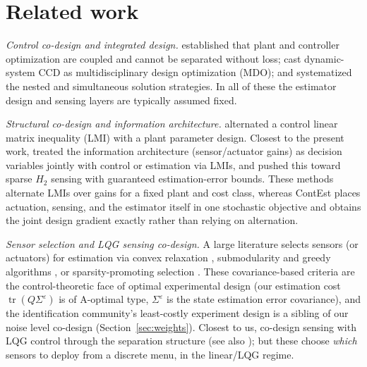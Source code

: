 \documentclass[twocolumn,amsthm]{autart}
\begin{document}
\section{Related work}\label{sec:related}

\emph{Control co-design and integrated design.}
\cite{fathy2001coupling} established that plant and controller optimization are
coupled and cannot be separated without loss; \cite{allison2014multidisciplinary}
cast dynamic-system CCD as multidisciplinary design optimization (MDO); and
\cite{herber2019nested} systematized the nested and simultaneous solution
strategies. In all of these the estimator design and sensing layers are typically assumed fixed.

\emph{Structural co-design and information architecture.}
\cite{grigoriadis1998integrate} alternated a control linear matrix inequality (LMI) with a plant parameter design. Closest to the present work, \cite{li2008integrating} treated the information architecture (sensor/actuator gains) as decision variables jointly with control or estimation via LMIs, and \cite{saraf2017h2,das2017sparse} pushed this toward sparse $H_2$ sensing with guaranteed estimation-error bounds. These methods alternate LMIs over gains for a fixed plant and cost class, whereas ContEst places actuation, sensing, and the estimator itself in one stochastic objective and obtains the joint design gradient exactly rather than relying on alternation.

\emph{Sensor selection and LQG sensing co-design.}
A large literature selects sensors (or actuators) for estimation via
convex relaxation \cite{joshi2009sensor}, submodularity and greedy algorithms
\cite{tzoumas2016sensor,zhang2017sensor}, or sparsity-promoting selection
\cite{dhingra2014admm}. These covariance-based criteria are the control-theoretic
face of optimal experimental design (our estimation cost
$\operatorname{tr}(Q\Sigma^\varepsilon)$ is of A-optimal type, $\Sigma^\varepsilon$ is the state estimation error covariance), and the
identification community's least-costly experiment design
\cite{gevers2005identification} is a sibling of our noise level
co-design (Section~\ref{sec:weights}).
Closest to us, \cite{tzoumas2021lqg} co-design sensing with LQG control through
the separation structure (see also \cite{siami2021separation,zardini2021codesign});
but these choose \emph{which} sensors to deploy from a discrete menu, in the
linear/LQG regime.
\end{document}
